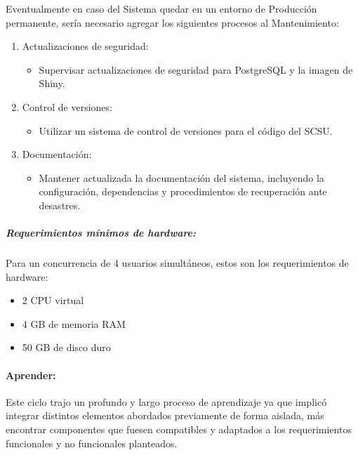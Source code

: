\documentclass[
  12pt,
  openany]{book}
\providecommand{\tightlist}{%
  \setlength{\itemsep}{0pt}\setlength{\parskip}{0pt}}
\begin{document}
Eventualmente en caso del Sistema quedar en un entorno de Producción permanente, sería necesario agregar los siguientes procesos al Mantenimiento:

\begin{enumerate}
\def\labelenumi{\arabic{enumi}.}
\item
  Actualizaciones de seguridad:

  \begin{itemize}
  \tightlist
  \item
    Supervisar actualizaciones de seguridad para PostgreSQL y la imagen de Shiny.
  \end{itemize}
\item
  Control de versiones:

  \begin{itemize}
  \tightlist
  \item
    Utilizar un sistema de control de versiones para el código del SCSU.
  \end{itemize}
\item
  Documentación:

  \begin{itemize}
  \tightlist
  \item
    Mantener actualizada la documentación del sistema, incluyendo la configuración, dependencias y procedimientos de recuperación ante desastres.
  \end{itemize}
\end{enumerate}

\hypertarget{requerimientos-muxednimos-de-hardware}{%
\subparagraph{Requerimientos mínimos de hardware:}\label{requerimientos-muxednimos-de-hardware}}

Para un concurrencia de 4 usuarios simultáneos, estos son los requerimientos de hardware:

\begin{itemize}
\tightlist
\item
  2 CPU virtual
\item
  4 GB de memoria RAM
\item
  50 GB de disco duro
\end{itemize}

\hypertarget{implemenapre}{%
\paragraph{Aprender:}\label{implemenapre}}

Este ciclo trajo un profundo y largo proceso de aprendizaje ya que implicó integrar distintos elementos abordados previamente de forma aislada, más encontrar componentes que fuesen compatibles y adaptados a los requerimientos funcionales y no funcionales planteados.
\end{document}
